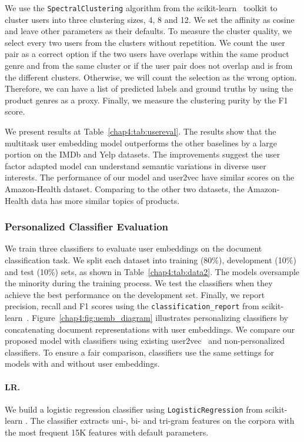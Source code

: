 We use the \texttt{SpectralClustering} algorithm from the scikit-learn~\cite{pedregosa2011scikit} toolkit to cluster users into three clustering sizes, 4, 8 and 12. 
We set the affinity as cosine and leave other parameters as their defaults.
To measure the cluster quality, we select every two users from the clusters without repetition.
We count the user pair as a correct option if the two users have overlaps within the same product genre and from the same cluster or if the user pair does not overlap and is from the different clusters.
Otherwise, we will count the selection as the wrong option.
Therefore, we can have a list of predicted labels and ground truths by using the product genres as a proxy.
Finally, we measure the clustering purity by the F1 score.

We present results at Table~\ref{chap4:tab:usereval}.
The results show that the multitask user embedding model outperforms the other baselines by a large portion on the IMDb and Yelp datasets.
The improvements suggest the user factor adapted model can understand semantic variations in diverse user interests.
The performance of our model and user2vec have similar scores on the Amazon-Health dataset.
Comparing to the other two datasets, the Amazon-Health data has more similar topics of products.


\subsubsection{Personalized Classifier Evaluation}

We train three classifiers to evaluate user embeddings on the document classification task.
We split each dataset into training (80\%), development (10\%) and test (10\%) sets, as shown in Table~\ref{chap4:tab:data2}. 
The models oversample the minority during the training process.
We test the classifiers when they achieve the best performance on the development set.
Finally, we report precision, recall and F1 scores using the \texttt{classification\_report} from scikit-learn~\cite{pedregosa2011scikit}.
Figure~\ref{chap4:fig:uemb_diagram} illustrates personalizing classifiers by concatenating document representations with user embeddings.
We compare our proposed model with classifiers using existing user2vec~\cite{amir2017quantifying} and non-personalized classifiers.
To ensure a fair comparison, classifiers use the same settings for models with and without user embeddings.

\paragraph{LR.}
We build a logistic regression classifier using \texttt{LogisticRegression} from scikit-learn \cite{pedregosa2011scikit}. The classifier extracts uni-, bi- and tri-gram features on the corpora with the most frequent 15K features with default parameters. 


